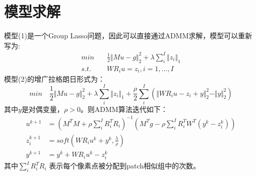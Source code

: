 \documentclass[UTF8]{article}
\begin{document}
\section{模型求解} 
\par 模型(1)是一个Group Lasso问题，因此可以直接通过ADMM求解，模型可以重新写为:
\begin{equation}
	\begin{aligned}
		min \quad& \frac{1}{2}\Vert Mu - g \Vert_2^2 + \lambda \sum_i^I  \Vert z_i \Vert_1 \\
		s.t. \quad& WR_iu = z_i, i= 1,\dots, I
	\end{aligned}
\end{equation}
模型(2)的增广拉格朗日形式为：
\begin{equation}
	min \quad \frac{1}{2}\Vert Mu - g \Vert_2^2 + \lambda \sum_i^I  \Vert z_i \Vert_1 + \frac{\rho}{2} \sum_i^I (\Vert WR_iu - z_i + y \Vert_2^2 - \Vert y\Vert_2^2)
\end{equation}
其中$y$是对偶变量，$\rho > 0$。则ADMM算法迭代如下：
\begin{equation}
	\begin{aligned}
		u^{k+1} & =  (M^TM+\rho \sum_i^I R_i^TR_i )^{-1} (M^Tg - \rho \sum_i^I R_i^T W^T (y^{k}-z_i^{k})) \\
		z_i^{k+1} &= soft( WR_iu^{k}  + y^{k}, \frac{\lambda}{\rho}) \\
		y^{k+1} & = y^{k} + WR_iu^{k} - z_i^{k}
	\end{aligned}
\end{equation}
其中$\sum_i^I R_i^TR_i$ 表示每个像素点被分配到patch相似组中的次数。
\end{document}
